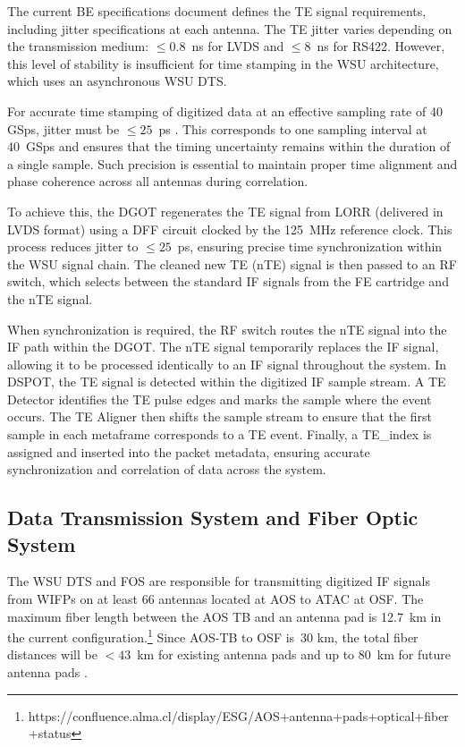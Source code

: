 The current \ac{BE} specifications document \cite{BEreqs} defines the \ac{TE} signal requirements, including jitter specifications at each antenna.
The \ac{TE} jitter varies depending on the transmission medium: $\le 0.8$~ns for \ac{LVDS} and $\le 8$~ns for RS422.
However, this level of stability is insufficient for time stamping in the \ac{WSU} architecture, which uses an asynchronous \ac{WSU} \ac{DTS}.

For accurate time stamping of digitized data at an effective sampling rate of 40 GSps, jitter must be $\le 25$~ps \cite{scwg}.
This corresponds to one sampling interval at 40~GSps and ensures that the timing uncertainty remains within the duration of a single sample.
Such precision is essential to maintain proper time alignment and phase coherence across all antennas during correlation.

To achieve this, the \ac{DGOT} regenerates the \ac{TE} signal from \ac{LORR} (delivered in \ac{LVDS} format) using a \ac{DFF} circuit clocked by the 125~MHz reference clock.
This process reduces jitter to $\le 25$~ps, ensuring precise time synchronization within the \ac{WSU} signal chain.
The cleaned new \ac{TE} (nTE) signal is then passed to an \ac{RF} switch, which selects between the standard \ac{IF} signals from the \ac{FE} cartridge and the nTE signal.

When synchronization is required, the \ac{RF} switch routes the nTE signal into the \ac{IF} path within the \ac{DGOT}.
The nTE signal temporarily replaces the \ac{IF} signal, allowing it to be processed identically to an \ac{IF} signal throughout the system.
In \ac{DSPOT}, the \ac{TE} signal is detected within the digitized \ac{IF} sample stream.
A \ac{TE} Detector identifies the \ac{TE} pulse edges and marks the sample where the event occurs.
The \ac{TE} Aligner then shifts the sample stream to ensure that the first sample in each metaframe corresponds to a \ac{TE} event. 
Finally, a \ac{TE}\_index is assigned and inserted into the packet metadata, ensuring accurate synchronization and correlation of data across the system.


\subsection{Data Transmission System and Fiber Optic System}
\label{sec:DTS}


The \ac{WSU} \ac{DTS} and \ac{FOS} are responsible for transmitting digitized \ac{IF} signals from \acp{WIFP} on at least 66 antennas located at \ac{AOS} to \ac{ATAC} at \ac{OSF}.
The maximum fiber length between the \ac{AOS} \ac{TB} and an antenna pad is 12.7~km in the current configuration.\footnote{https://confluence.alma.cl/display/ESG/AOS+antenna+pads+optical+fiber+status}
Since \ac{AOS}-\ac{TB} to \ac{OSF} is~30 km, the total fiber distances will be $<43$~km for existing antenna pads and up to 80~km for future antenna pads \cite{dts_pdr_dsn}.

